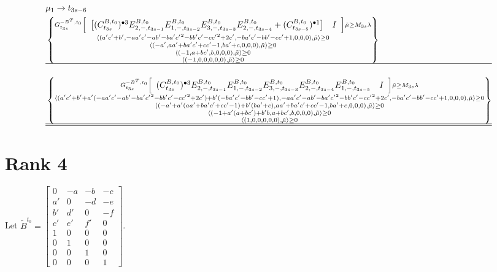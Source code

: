 \documentclass{amsart}
\numberwithin{theorem}{section}
\begin{document}
\begin{landscape}
  \begin{align*}
    &\mu_1\to t_{3s-6}\\ %
    &\left\{\substack{
      G^{-B^T,t_0}_{t_{3s}} \left[\begin{array}{cc} \big[ (C^{B,t_0}_{t_{3s}})^{\bullet 3} E^{B,t_0}_{2,-,t_{3s-1}} E^{B,t_0}_{1,-,t_{3s-2}} E^{B,t_0}_{3,-,t_{3s-3}} E^{B,t_0}_{2,-,t_{3s-4}} + (C^{B,t_0}_{t_{3s-5}})^{\bullet 1} \big] & I \end{array}\right] \tilde\mu \ge M_{3s}\lambda\\
      \langle(a'c'+b',-aa'c'-ab'-ba'{c'}^2-bb'c'-c{c'}^2+2c',-ba'c'-bb'-cc'+1,0,0,0),\tilde\mu\rangle \ge 0\\
      \langle(-a',aa'+ba'c'+cc'-1,ba'+c,0,0,0),\tilde\mu\rangle \ge 0\\
      \langle(-1,a+bc',b,0,0,0),\tilde\mu\rangle \ge 0\\
      \langle(-1,0,0,0,0,0),\tilde\mu\rangle \ge 0
      }\right\}\\
      \hline\\
    &\left\{\substack{
      G^{-B^T,t_0}_{t_{3s}} \left[\begin{array}{cc} (C^{B,t_0}_{t_{3s}})^{\bullet 3} E^{B,t_0}_{2,-,t_{3s-1}} E^{B,t_0}_{1,-,t_{3s-2}} E^{B,t_0}_{3,-,t_{3s-3}} E^{B,t_0}_{2,-,t_{3s-4}} E^{B,t_0}_{1,-,t_{3s-5}} & I \end{array}\right] \tilde\mu \ge M_{3s}\lambda\\
        \langle(a'c'+b'+a'(-aa'c'-ab'-ba'{c'}^2-bb'c'-c{c'}^2+2c')+b'(-ba'c'-bb'-cc'+1),-aa'c'-ab'-ba'{c'}^2-bb'c'-c{c'}^2+2c',-ba'c'-bb'-cc'+1,0,0,0),\tilde\mu\rangle \ge 0\\
      \langle(-a'+a'(aa'+ba'c'+cc'-1)+b'(ba'+c),aa'+ba'c'+cc'-1,ba'+c,0,0,0),\tilde\mu\rangle \ge 0\\
      \langle(-1+a'(a+bc')+b'b,a+bc',b,0,0,0),\tilde\mu\rangle \ge 0\\
      \langle(1,0,0,0,0,0),\tilde\mu\rangle \ge 0
      }\right\}\\
      \hline\hline %
  \end{align*}

  \section{Rank 4}
  Let $\tilde B^{t_0}=\left[\begin{array}{cccc} 0 & -a & -b & -c\\ a' & 0 & -d & -e\\ b' & d' & 0 & -f\\ c' & e' & f' & 0 \\ 1 & 0 & 0 & 0\\ 0 & 1 & 0 & 0\\ 0 & 0 & 1 & 0\\ 0 & 0 & 0 & 1\end{array}\right]$.


\end{landscape}
\end{document}
